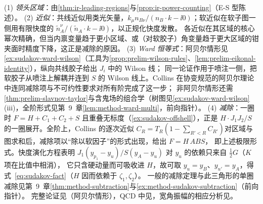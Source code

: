 \begin{proofsketch}
(1) \emph{领头区域}：由\cref{thm:ir-leading-regions}与\cref{prop:ir-power-counting}（E-S 型陈述）。
(2) \emph{近似}：共线近似用类光矢量，$k_\mu n_{B\nu}/(n_B\cdot k-\ii0)$；软近似在软子图一侧用有限快度的 $\tilde n_A^\nu/(\tilde n_A\cdot k-\ii0)$，以正规化快度发散\cite[式~(10.15)--(10.24)]{Collins2011}。
各近似在其区域的核心幂次精确，但当内禀变量趋于更小区域、或（对软胶子）角变量趋于更大区域的钳夹面时精度下降，这正是减除的原因\cite[第~10.3、10.4、10.6~节]{Collins2011}。
(3) \emph{Ward 恒等式}：阿贝尔情形见\cref{ex:sudakov-ward-wilson}（工具为\cref{prop:prelim-wilson-rules}、\cref{lem:prelim-eikonal-identity}），纵向共线胶子给出 $J_i$ 中的 Wilson 线；
同一论证作用于喷注一侧，把软胶子从喷注上解耦并连到 $S$ 的 Wilson 线上。Collins 在协变规范的阿贝尔理论中连同减除项与不可约性要求对所有阶完成了这一步\cite[第~10.8.3--10.8.5~节]{Collins2011}；
非阿贝尔情形还需\cref{thm:prelim-slavnov-taylor}与含鬼场的组合学（树图见\cref{ex:sudakov-ward-wilson}(iii)，全阶形式见第~9~章\cref{lem:method-ward-multi}，前向指针）。
(4) \emph{减除}：一圈时 $F=H+C_1+C_2+S$ 且重叠无标度（\cref{ex:sudakov-offshell}），正是 $H\cdot J_1J_2/S$ 的一圈展开。全阶上，Collins 的逐次近似
$C_R=T_R(1-\sum_{R'<R}C_{R'})$\cite[式~(10.4)]{Collins2011}对区域与图求和后，减除项以“除以软因子”的形式出现\cite[式~(10.94)--(10.95)]{Collins2011}，给出 $F=H\,ABS$\cite[式~(10.11)]{Collins2011}，
即上述极限形式\cite[式~(10.109)]{Collins2011}。快度演化方程\cite[式~(10.112)--(10.117)]{Collins2011}表明 $J_1(y_{p_1}-y_u)/S(y_A-y_u)$ 对 $y_u$ 的依赖只来自 $\frac12G$（$K$ 项在比值中相消），
它只含硬动量而可吸收进 $H$，故可取 $y_u=y_B$、$y_{u'}=y_A$，得式~\eqref{eq:sudakov-fact}（$H$ 因而依赖于 $\zeta_1,\zeta_2$）。
一般的减除定理与此三角形的单圈减除见第~9~章\cref{thm:method-subtraction}与\cref{ex:method-sudakov-subtraction}（前向指针）。
完整论证见\cite[第~10.3、10.8--10.10~节]{Collins2011}（阿贝尔情形），QCD 中见\cite{Mueller:1979ih,Collins:1980ih,Sen:1981sd,Korchemsky1989,Collins:1989bt,Magnea:1990zb}，宽角振幅的相应分析见\cite{Akhoury1979,Sen1983}。
\end{proofsketch}


